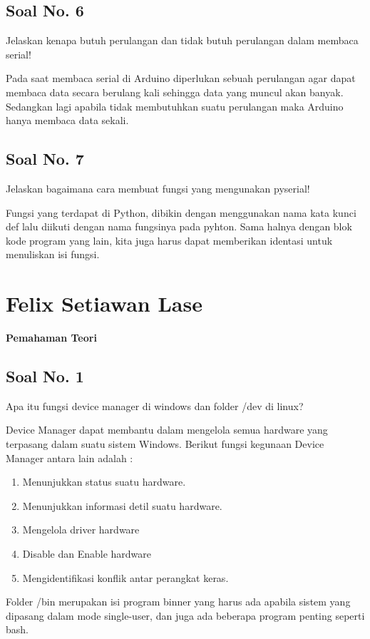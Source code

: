 \subsection{Soal No. 6}
Jelaskan kenapa butuh perulangan dan tidak butuh perulangan dalam membaca serial!

\hfill \break
Pada saat membaca serial di Arduino diperlukan sebuah perulangan agar dapat membaca data secara berulang kali sehingga data yang muncul akan banyak. Sedangkan lagi apabila tidak membutuhkan suatu perulangan maka Arduino hanya membaca data sekali.

\subsection{Soal No. 7}
Jelaskan bagaimana cara membuat fungsi yang mengunakan pyserial!

\hfill \break
Fungsi yang terdapat di Python, dibikin dengan menggunakan nama kata kunci def lalu diikuti dengan nama fungsinya pada pyhton.
Sama halnya dengan blok kode program yang lain, kita juga harus dapat memberikan identasi untuk menuliskan isi fungsi.
\section{Felix Setiawan Lase}
{\Large \textbf{Pemahaman Teori}}
\subsection{Soal No. 1}
Apa itu fungsi device manager di windows dan folder /dev di linux?

\hfill \break
Device Manager  dapat  membantu dalam mengelola  semua hardware yang terpasang  dalam suatu sistem Windows. 
 Berikut fungsi kegunaan Device Manager antara lain adalah :
\begin{enumerate}
	\item Menunjukkan status suatu hardware.
	\item Menunjukkan informasi detil suatu hardware.
	\item Mengelola driver hardware
	\item Disable dan Enable hardware
	\item Mengidentifikasi konflik antar perangkat keras.
\end{enumerate}

\hfill \break
Folder /bin merupakan isi program binner yang harus ada apabila sistem yang dipasang dalam mode single-user, dan juga  ada beberapa program penting seperti bash.

